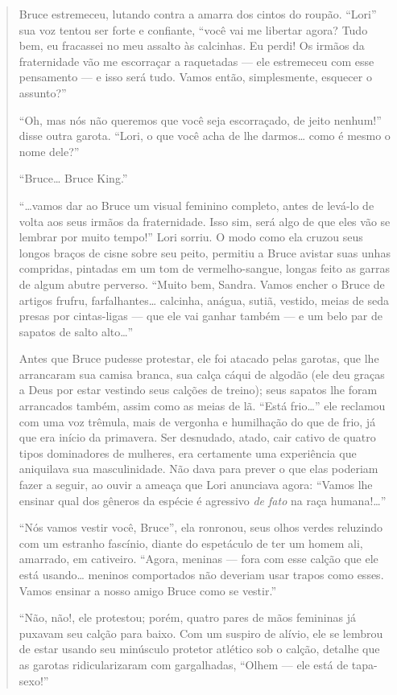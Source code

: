 \begin{quote}
Bruce estremeceu, lutando contra a amarra dos cintos do roupão.
``Lori'' sua voz tentou ser forte e
confiante, ``você vai me libertar agora? Tudo bem, eu
fracassei no meu assalto às calcinhas. Eu perdi! Os irmãos da
fraternidade vão me escorraçar a raquetadas --- ele estremeceu com
esse pensamento --- e isso será tudo. Vamos então, simplesmente,
esquecer o assunto?''

``Oh, mas nós não queremos que você seja escorraçado,
de jeito nenhum!'' disse outra garota.
``Lori, o que você acha de lhe darmos\ldots{} como é mesmo o
nome dele?''

``Bruce\ldots{} Bruce King.''

``\ldots{}vamos dar ao Bruce um visual feminino completo,
antes de levá-lo de volta aos seus irmãos da fraternidade. Isso sim,
será algo de que eles vão se lembrar por muito tempo!''
Lori sorriu. O modo como ela cruzou seus longos braços de cisne sobre seu
peito, permitiu a Bruce avistar suas unhas compridas, pintadas em um tom de
vermelho-sangue, longas feito as garras de algum abutre perverso.
``Muito bem, Sandra. Vamos encher o Bruce de artigos
frufru, farfalhantes\ldots{} calcinha, anágua, sutiã, vestido, meias de seda
presas por cintas-ligas --- que ele vai ganhar também --- e um belo
par de sapatos de salto alto\ldots{}''

Antes que Bruce pudesse protestar, ele foi atacado pelas garotas,
que lhe arrancaram sua camisa branca, sua calça cáqui de algodão (ele
deu graças a Deus por estar vestindo seus calções de treino); seus
sapatos lhe foram arrancados também, assim como as meias de lã.
``Está frio\ldots{}'' ele reclamou com uma voz
trêmula, mais de vergonha e humilhação do que de frio, já que era
início da primavera. Ser desnudado, atado, cair cativo de quatro tipos
dominadores de mulheres, era certamente uma experiência que aniquilava
sua masculinidade. Não dava para prever o que elas poderiam fazer a
seguir, ao ouvir a ameaça que Lori anunciava agora:
``Vamos lhe ensinar qual dos gêneros da espécie é
agressivo \textit{de fato} na raça humana!\ldots{}''

``Nós vamos vestir você, Bruce'', ela
ronronou, seus olhos verdes reluzindo com um estranho fascínio, diante
do espetáculo de ter um homem ali, amarrado, em cativeiro.
``Agora, meninas --- fora com esse calção que ele está
usando\ldots{} meninos comportados não deveriam usar trapos como esses.
Vamos ensinar a nosso amigo Bruce como se vestir.''

``Não, não!, ele protestou; porém, quatro pares de mãos
femininas já puxavam seu calção para baixo. Com um suspiro de alívio,
ele se lembrou de estar usando seu minúsculo protetor atlético sob o
calção, detalhe que as garotas ridicularizaram com gargalhadas,
``Olhem --- ele está de tapa-sexo!''


\end{quote}
